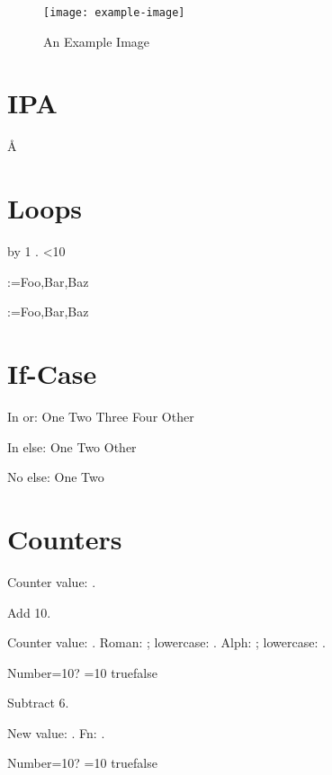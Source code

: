 \documentclass{article}
\begin{document}
\begin{figure}[htbp]
\centering
 \texttt{[image: example-image]}
 \caption{An Example Image}
 \label{fig:sample}
\end{figure}

\section{IPA}\label{sec:ipa}
 \AA {}
\textschwa

\section{Loops}

\newcount\myctr
\loop
 \advance\myctr by 1\relax
 \the\myctr.
\ifnum\myctr<10
\repeat

\makeatletter
\@for\tmp:=Foo,Bar,Baz

\def\tmplist{Foo,Bar,Baz}
\@for\tmp:=\tmplist{}
\makeatother

\section{If-Case}

\relax
In or:
\ifcase\myctr
 One%
 \or 
 Two%
 \or
 Three%
 \or
 Four%
 \else
 Other%
\fi

In else:
\ifcase\myctr
 One%
 \or 
 Two%
 \else
 Other%
\fi

No else:
\ifcase\myctr
 One%
 \or 
 Two%
\fi

\section{Counters}
\label{sec:counters}

Counter value: \themycounter.

Add 10.
\addtocounter{mycounter}{10}
Counter value: \themycounter.
Roman: ; lowercase: .
Alph: ; lowercase: .

Number=10? \ifnum\value{mycounter}=10 true\else false\fi

Subtract 6.
\addtocounter{mycounter}{-6}
New value: .
Fn: .

Number=10? \ifnum\value{mycounter}=10 true\else false\fi



\end{document}
